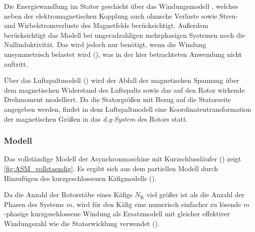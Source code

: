 Die Energiewandlung im Stator geschieht über das Windungsmodell , welches neben der elektro\-mag\-ne\-ti\-schen Kopplung auch ohmsche Verluste sowie Streu- und Wirbelstromverluste des Magnetfelds berücksichtigt. Außerdem berücksichtigt das Modell  bei ungeradzahligen mehrphasigen Systemen noch die Nullinduktivität. Das wird jedoch nur benötigt, wenn die Windung unsymmetrisch belastet wird (\cite[S. 193]{kralModelicaObjektorientierteModellbildung2019}), was in der hier betrachteten Anwendung nicht auftritt.

Über das Luftspaltmodell () wird der Abfall der magnetischen Spannung über dem magnetischen Widerstand des Luftspalts sowie das auf den Rotor wirkende Drehmoment modelliert. Da die Statorgrößen mit Bezug auf die Statorseite angegeben werden, findet in dem Luftspaltmodell eine Koordinatentransformation der magnetischen Größen in das \emph{d,q-System} des Rotors statt.

\hypertarget{sec:modell-ASM}{%
\subsubsection{Modell}\label{sec:modell-ASM}}

Das vollständige Modell der Asynchronmaschine mit Kurzschlussläufer () zeigt \cref{fig:ASM_vollstaendig}. Es ergibt sich aus dem partiellen Modell durch Hinzufügen des kurzgeschlossenen Käfigmodells ().

Da die Anzahl der Rotorstäbe eines Käfigs $N_{\mathrm{R}}$  viel größer ist als die Anzahl der Phasen des Systems $m$, wird für den Käfig eine numerisch einfacher zu lösende $m$-phasige kurzgeschlossene Windung als Ersatzmodell mit gleicher effektiver Windungszahl wie die Statorwicklung verwendet (\cite[S. 194]{kralModelicaObjektorientierteModellbildung2019}).

